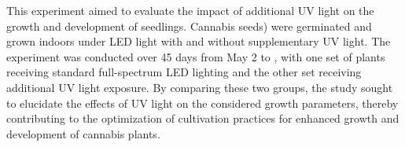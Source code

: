 This experiment aimed to evaluate the impact of additional UV light on the growth and development of  seedlings. Cannabis seeds) were germinated and grown indoors under LED light with and without supplementary UV light. The experiment was conducted over \num[mode=text]{45} days from May 2 to , with one set of plants receiving standard full-spectrum LED lighting and the other set receiving additional UV light exposure. By comparing these two groups, the study sought to elucidate the effects of UV light on the considered growth parameters, thereby contributing to the optimization of cultivation practices for enhanced growth and development of cannabis plants.